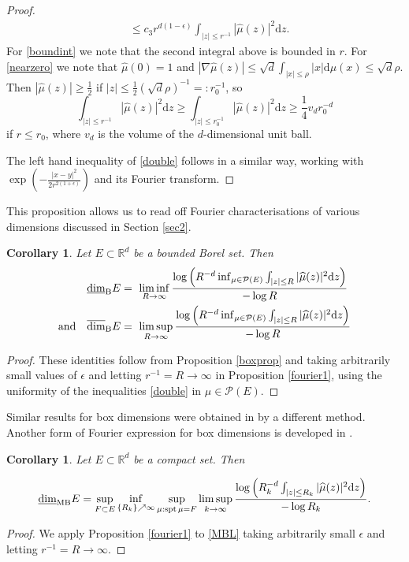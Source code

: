 \documentclass[12pt]{article}
\newcommand{\1}{{\bf 1}}
\newcommand{\e}{\epsilon}
\DeclareMathOperator{\spt}{spt}
\newcommand\ubd{\overline{\mbox{\rm dim}}_{\rm B}} %
\newcommand\lbd{\underline{\mbox{\rm dim}}_{\rm B}} %
\newcommand\mlbd{\underline{\mbox{\rm dim}}_{\rm MB}} %
\newtheorem{cor}[theo]{Corollary}
\begin{document}
\begin{proof}
\begin{align}
&\leq c_3 r^{d(1-\e)} \int_{|z| \leq r^{-1}} |{\widehat {\mu}(z)}|^2 \mathrm{d}z. \label{nearzero}
\end{align}
For \eqref{boundint} we note that the second integral above is bounded in $r$. For \eqref{nearzero}  we note that ${\widehat {\mu}(0)}=1$ and 
$|\nabla  \widehat {\mu}(z)| \leq \sqrt{d}\int_{|x|\leq\rho} |x|\mathrm{d}\mu(x)\leq \sqrt{d}\rho$.
Then $|{\widehat {\mu}(z)}|\geq \frac{1}{2}$  
 if $|z| \leq \frac{1}{2}(\sqrt{d}\rho)^{-1}=:r_0^{-1}$, 
  so 
$$\int_{|z| \leq r^{-1}} |{\widehat {\mu}(z)}|^2 \mathrm{d}z \geq \int_{|z| \leq r_0^{-1} }|{\widehat {\mu}(z)}|^2 \mathrm{d}z \geq  \textstyle{\frac{1}{4}}v_d r_0^{-d}$$ 
if $r\leq r_0$, where $v_d$ is the volume of the $d$-dimensional unit ball. 



The left hand inequality of  \eqref{double} follows in a similar way, working with  $\exp(-\frac{|x-y|^2}{2r^{2(1+\e)}})$ and its Fourier transform.
\end{proof}


This proposition allows us to read off Fourier characterisations of various dimensions discussed in Section \ref{sec2}.
\begin{cor}\label{fdimcor}
Let $E \subset \mathbb{R}^d$ be a bounded Borel set. Then
\begin{align*}
\lbd E &=\ \liminf_{R \rightarrow \infty}\frac{\log \Big(R^{-d} \inf_{\mu \in \mathcal{P}(E)} \int_{|z| \leq R} |{\widehat {\mu}(z)}|^2 \mathrm{d}z\Big)}{- \log R}
 \\
\mbox{and} \quad 
\ubd E &=\ \limsup_{R \rightarrow \infty}\frac{\log \Big(R^{-d} \inf_{\mu \in \mathcal{P}(E)} \int_{|z| \leq R} |{\widehat {\mu}(z)}|^2 \mathrm{d}z\Big)}{- \log R}
\end{align*}
\end{cor}
\begin{proof}
These identities follow from Proposition \ref{boxprop} and taking arbitrarily small values of $\epsilon$  and letting $r^{-1}=R \to \infty$ in Proposition \ref{fourier1}, using the uniformity of the inequalities \eqref{double} in $\mu\in\mathcal{P}(E)$.
\end{proof}

Similar results for box dimensions were obtained in \cite{Fr} by a different method.  Another form of Fourier expression for box dimensions is developed in \cite{Fa}.
\begin{cor}
	Let $E \subset \mathbb{R}^d$ be a compact set. Then
	
	\begin{equation*}
		\mlbd E= \sup_{F\subset E}\inf_{\{R_k\}\nearrow\infty}\sup_{\mu:\spt\mu=F}\limsup_{k\to\infty}  \frac{\log \Big(R_k^{-d}   \int_{|z| \leq R_k} |{\widehat {\mu}(z)}|^2 \mathrm{d}z\Big)}{- \log R_k}.  
	\end{equation*}
\end{cor}
\begin{proof}
We apply Proposition \ref{fourier1} to \eqref{MBL} taking arbitrarily small $\epsilon$ and letting $r^{-1}=R \to \infty$.
\end{proof}
\end{document}
